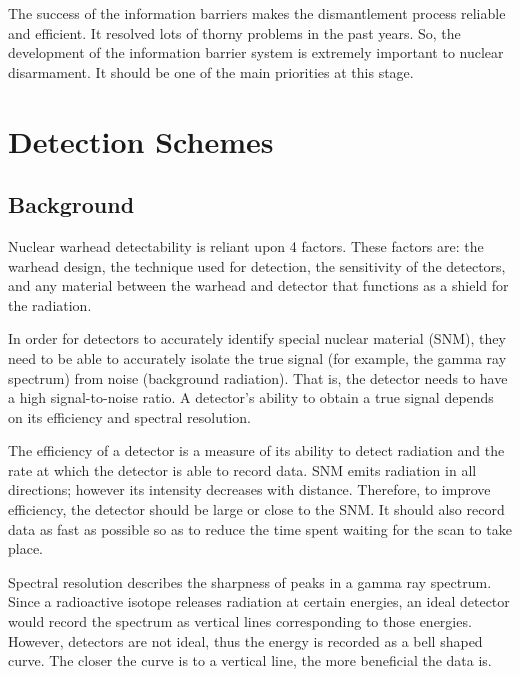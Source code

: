 \documentclass[twoside,titlepage,11pt,twocolumn,a4paper]{article}
\begin{document}
The success of the information barriers makes the dismantlement
process reliable and efficient. It resolved lots of thorny problems in
the past years. So, the development of the information barrier system
is extremely important to nuclear disarmament. It should be one of the
main priorities at this stage.

\section{Detection Schemes}
\subsection{Background}

Nuclear warhead detectability is reliant upon 4 factors. These factors
are: the warhead design, the technique used for detection, the
sensitivity of the detectors, and any material between the warhead and
detector that functions as a shield for the
radiation. \citep{hippel1990}

In order for detectors to accurately identify special nuclear material
(SNM), they need to be able to accurately isolate the true signal (for
example, the gamma ray spectrum) from noise (background
radiation). That is, the detector needs to have a high signal-to-noise
ratio. A detector's ability to obtain a true signal depends on its
efficiency and spectral resolution. \citep{medalia2007}

The efficiency of a detector is a measure of its ability to detect
radiation and the rate at which the detector is able to record
data. \citep{medalia2007,bushberg1994} SNM emits radiation in all
directions; however its intensity decreases with distance. Therefore,
to improve efficiency, the detector should be large or close to the
SNM. It should also record data as fast as possible so as to reduce
the time spent waiting for the scan to take place. \citep{medalia2007}

Spectral resolution describes the sharpness of peaks in a gamma ray
spectrum. Since a radioactive isotope releases radiation at certain
energies, an ideal detector would record the spectrum as vertical
lines corresponding to those energies. However, detectors are not
ideal, thus the energy is recorded as a bell shaped curve. The closer
the curve is to a vertical line, the more beneficial the data
is. \citep{medalia2007}
\end{document}
